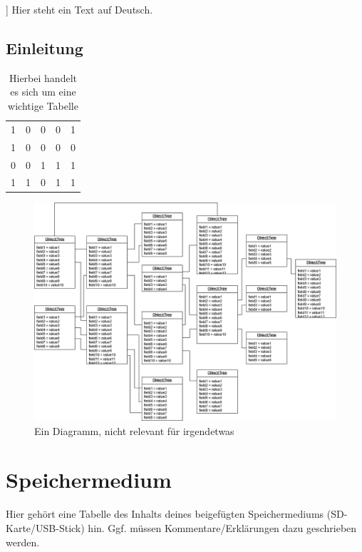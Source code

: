 \documentclass[german=true,thesistype=bachelor,nolistoffigures,nodate]{tubsthesis}
\begin{document}
    \thesisabstract[%
        This is an english text.\\
        \lipsum[1-2]
    ]{%
        Hier steht ein Text auf Deutsch.\\
        \lipsum[3-4]
    }

    \begin{thesis}

        \chapter{Einleitung}

        \lipsum[1-3]
        \begin{table}[h]
            \centering
            \begin{tabular}{c|c|c|c|c}
            1 & 0 & 0 & 0 & 1 \\
            1 & 0 & 0 & 0 & 0 \\
            0 & 0 & 1 & 1 & 1 \\
            1 & 1 & 0 & 1 & 1
            \end{tabular}
            \caption[Wichtige Tabelle]{Hierbei handelt es sich um eine wichtige Tabelle}
            \label{tab:important}
        \end{table}

        \begin{figure}
        \centering
        \includegraphics[width=\textwidth]{images/example_diagram.png}
        \caption{Ein Diagramm, nicht relevant für irgendetwas~\cite{lisa}}
        \label{fig:inga}
        \end{figure}

        \lipsum[4-7]

    \end{thesis}

    \chapter{Speichermedium}
    Hier gehört eine Tabelle des Inhalts deines beigefügten Speichermediums (SD-Karte/USB-Stick) hin.
    Ggf. müssen Kommentare/Erklärungen dazu geschrieben werden.
\end{document}
